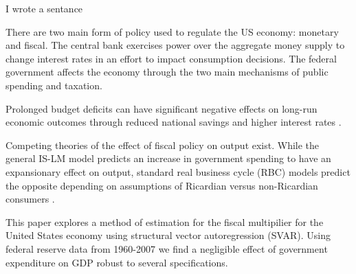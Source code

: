 I wrote a sentance 

There are two main form of policy used to regulate the US economy: monetary and fiscal.  The central bank exercises power over the aggregate money supply to change interest rates in an effort to impact consumption decisions.  The federal government affects the economy through the two main mechanisms of public spending and taxation.  

Prolonged budget deficits can have significant negative effects on long-run economic outcomes through reduced national savings and higher interest rates \parencite{gale2003economic}. 


Competing theories of the effect of fiscal policy on output exist.  While the general IS-LM model predicts an increase in government spending to have an expansionary effect on output, standard real business cycle (RBC) models predict the opposite depending on assumptions of Ricardian versus non-Ricardian consumers \parencite{gali2007understanding}.




This paper explores a method of estimation for the fiscal multipilier for the United States economy using structural vector autoregression (SVAR).  Using federal reserve data from 1960-2007 we find a negligible effect of government expenditure on GDP robust to several specifications.